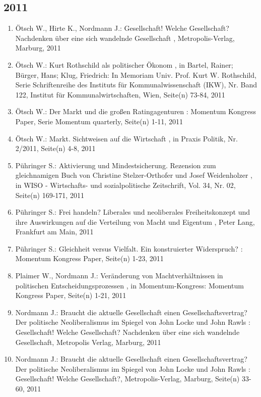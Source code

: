  \subsection*{2011} 
 \begin{enumerate}[leftmargin=*, labelsep=0.5cm] 
	 \item Ötsch W., Hirte K., Nordmann J.:  Gesellschaft! Welche Gesellschaft? Nachdenken über eine sich wandelnde Gesellschaft  , Metropolis-Verlag, Marburg, 2011
	 \item Ötsch W.:  Kurt Rothschild als politischer Ökonom  , in Bartel, Rainer; Bürger, Hans; Klug, Friedrich: In Memoriam Univ. Prof. Kurt W. Rothschild, Serie Schriftenreihe des Instituts für Kommunalwissenschaft (IKW), Nr. Band 122, Institut für Kommunalwirtschaften, Wien, Seite(n) 73-84, 2011
	 \item Ötsch W.:  Der Markt und die großen Ratingagenturen  : Momentum Kongress Paper, Serie Momentum quarterly, Seite(n) 1-11, 2011
	 \item Ötsch W.:  Markt. Sichtweisen auf die Wirtschaft  , in Praxis Politik, Nr. 2/2011, Seite(n) 4-8, 2011
	 \item Pühringer S.:  Aktivierung und Mindestsicherung. Rezension zum gleichnamigen Buch von Christine Stelzer-Orthofer und Josef Weidenholzer  , in WISO - Wirtschafts- und sozialpolitische Zeitschrift, Vol. 34, Nr. 02, Seite(n) 169-171, 2011
	 \item Pühringer S.:  Frei handeln? Liberales und neoliberales Freiheitskonzept und ihre Auswirkungen auf die Verteilung von Macht und Eigentum  , Peter Lang, Frankfurt am Main, 2011
	 \item Pühringer S.:  Gleichheit versus Vielfalt. Ein konstruierter Widerspruch?  : Momentum Kongress Paper, Seite(n) 1-23, 2011
	 \item Plaimer W., Nordmann J.:  Veränderung von Machtverhältnissen in politischen Entscheidungsprozessen  , in Momentum-Kongress: Momentum Kongress Paper, Seite(n) 1-21, 2011
	 \item Nordmann J.:  Braucht die aktuelle Gesellschaft einen Gesellschaftsvertrag? Der politische Neoliberalismus im Spiegel von John Locke und John Rawls  : Gesellschaft! Welche Gesellschaft? Nachdenken über eine sich wandelnde Gesellschaft, Metropolis Verlag, Marburg, 2011
	 \item Nordmann J.:  Braucht die aktuelle Gesellschaft einen Gesellschaftsvertrag? Der politische Neoliberalismus im Spiegel von John Locke und John Rawls  : Gesellschaft! Welche Gesellschaft?, Metropolis-Verlag, Marburg, Seite(n) 33-60, 2011

\end{enumerate}
